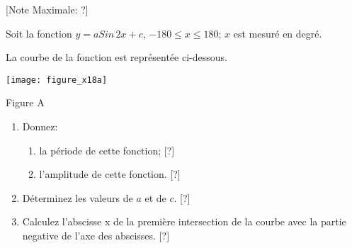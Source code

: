 \begin{question}
  \hspace*{\fill} [Note Maximale: ?]\par
  \noindent Soit la fonction $y = a Sin\,2x + c$, $-180 \le x \le 180$; $x$ est mesuré en degré.\par
  \medskip
  \begin{center} %
    \noindent La courbe de la fonction est représentée ci-dessous.\par
    \texttt{[image: figure\_x18a]}\par
    \noindent Figure A\par
  \end{center} %

  \begin{enumerate}[label=(\alph*)]
    \item Donnez:
      \begin{enumerate}[label=(\roman*)]
        \item la période de cette fonction;\hspace*{\fill} [?] %
        \item l'amplitude de cette fonction.\hspace*{\fill} [?]
      \end{enumerate}
    \item Déterminez les valeurs de $a$ et de $c$.\hspace*{\fill} [?]
    \item Calculez l'abscisse x de la première intersection de la courbe avec la partie negative de l'axe
des abscisses.\hspace*{\fill} [?]
  \end{enumerate}
\end{question}
